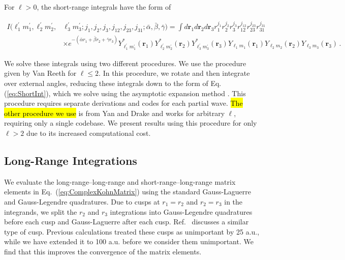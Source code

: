 \documentclass[preprint,showpacs,showkeys,preprintnumbers,amsmath,amssymb,longbibliography,pra,aps]{revtex4-1}
\begin{document}
{For $\ell > 0$, the short-range integrals have the form of
\begin{widetext}
\begin{align}
\label{eq:ShortIntGen}
\nonumber I(\ell_1^\prime m_1^\prime, \ell_2^\prime m_2^\prime, &\ell_3^\prime m_3^\prime; j_1,j_2,j_3,j_{12},j_{23},j_{31}; \bar{\alpha}, \bar{\beta}, \bar{\gamma}) = \int d \textbf{r}_1 d \textbf{r}_2 d \textbf{r}_3
r_1^{j_1} r_2^{j_2} r_3^{j_3} r_{12}^{j_{12}}
r_{23}^{j_{23}} r_{31}^{j_{31}} \\
& \times e^{-(\bar{\alpha} r_1 + \bar{\beta} r_2 + \bar{\gamma} r_3)}
Y_{\ell_1^\prime m_1^\prime}^* (\textbf{r}_1) Y_{\ell_2^\prime m_2^\prime}^* (\textbf{r}_2) Y_{\ell_3^\prime m_3^\prime}^* (\textbf{r}_3) Y_{\ell_1 m_1} (\textbf{r}_1) Y_{\ell_2 m_2} (\textbf{r}_2) Y_{\ell_3 m_3} (\textbf{r}_3)\, .
\end{align}
\end{widetext}
We solve these integrals using two different procedures.
We use the procedure given by Van Reeth \cite{VanReethThesis}
for $\ell \leq 2$. In this 
procedure, we rotate and then integrate over external angles, reducing these 
integrals down to the form of Eq. (\ref{eq:ShortInt}), which we solve using
the asymptotic expansion method \cite{Drake1995}.
This procedure requires separate derivations and codes
for each partial wave. \hl{The other procedure we use}
is from Yan and Drake \cite{Yan1997}
and works for arbitrary $\ell$, requiring only a single codebase.
We present results using this procedure for only $\ell > 2$ due
to its increased computational cost.

\subsection{Long-Range Integrations}
\label{sec:LongInt}
We evaluate the long-range--long-range and short-range--long-range matrix 
elements in Eq.~(\ref{eq:ComplexKohnMatrix}) using the standard Gauss-Laguerre
and Gauss-Legendre quadratures. Due to cusps at $r_1 = r_2$ and
$r_2 = r_3$ in the integrands, we split the $r_2$ and $r_3$ integrations into 
Gauss-Legendre quadratures before each cusp and Gauss-Laguerre after each cusp.
Ref.~\cite{Armour1991} discusses a similar type of cusp.
Previous calculations \cite{VanReeth2003,VanReeth2004} treated these cusps as 
unimportant by 25 a.u., while we have extended it to 100 a.u. before we consider 
them unimportant. We find that this improves the convergence of the matrix 
elements.

}
\end{document}
